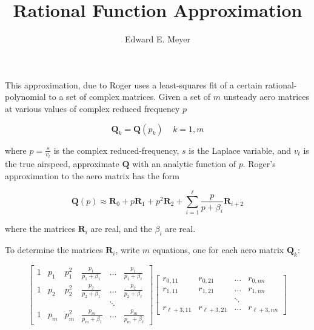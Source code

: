 \documentclass[11pt]{article}
\newcommand{\Matrix}[1]{\boldsymbol{#1}}
\begin{document}
\title{\large Rational Function Approximation}
\author{Edward E. Meyer}
\maketitle

This approximation,
due to Roger \cite{roger}
uses a least-squares fit of a certain rational-polynomial
to a set of complex matrices.
Given a set of
$m$
unsteady aero matrices at various values of complex
reduced frequency
$p$

\begin{equation}
\Matrix{Q}_k = \Matrix{Q}(p_k) \; \; \; \; k = 1, m
\end{equation}

where
$p = \frac{s}{v_t}$
is the complex reduced-frequency,
$s$ is the Laplace variable, and $v_t$ is the true airspeed,
approximate $\Matrix{Q}$ with an analytic function of $p$.
Roger's approximation to the aero matrix has the form

\begin{equation}
  \Matrix{Q}(p) \approx \Matrix{R}_0 + p\Matrix{R}_1 + p^2 \Matrix{R}_2 +  \sum_{i=1}^{\ell} \frac{p}{p + \beta_i} \Matrix{R}_{i+2}
\end{equation}

where the matrices $\Matrix{R}_i$ are real, and the $\beta_i$ are real.

\par
To determine the matrices $\Matrix{R}_i$, write $m$ equations, one
for each aero matrix $\Matrix{Q}_k$:

\begin{displaymath}
\left[
\begin{array}{cccccc}
1 & p_1 & p_1^2 & \frac{p_1}{p_1 + \beta_1} & \ldots & \frac{p_1}{p_1 + \beta_{\ell}} \\
1 & p_2 & p_2^2 & \frac{p_2}{p_2 + \beta_1} & \ldots & \frac{p_2}{p_2 + \beta_{\ell}} \\
  &     &       &                           & \ddots &                           \\
1 & p_m & p_m^2 & \frac{p_m}{p_m + \beta_1} & \ldots & \frac{p_m}{p_m + \beta_{\ell}}
\end{array}
\right]
\left[
\begin{array}{cccc}
r_{0,11}   & r_{0,21}   & \ldots & r_{0,nn} \\
r_{1,11}   & r_{1,21}   & \ldots & r_{1,nn} \\
           &            & \ddots &          \\
r_{\ell+3,11} & r_{\ell+3,21} & \ldots & r_{\ell+3,nn}
\end{array}
\right]
\end{displaymath}
\end{document}

